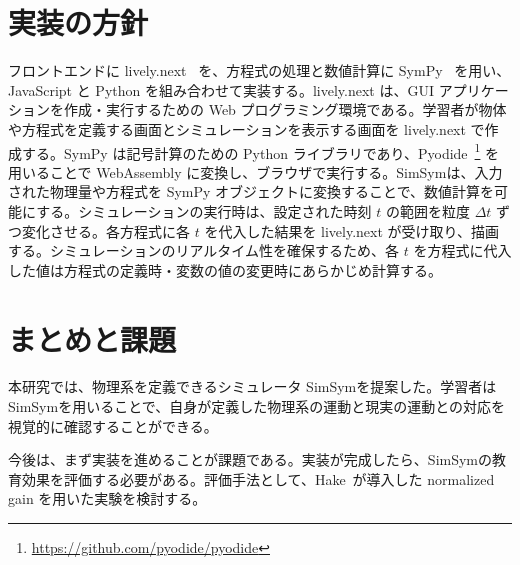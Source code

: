 \documentclass[11pt, a4paper, oneside, twocolumn, dvipdfmx]{jsarticle}
\newcommand{\simname}{SimSym}
\begin{document}
\section{実装の方針} \label{sec3}
フロントエンドに lively.next~\cite{ingalls_2008} を、方程式の処理と数値計算に
SymPy~\cite{meurer_sympy_2017} を用い、JavaScript と Python を組み合わせて実装する。lively.next は、GUI アプリケーションを作成・実行するための Web プログラミング環境である。学習者が物体や方程式を定義する画面とシミュレーションを表示する画面を lively.next で作成する。SymPy は記号計算のための Python ライブラリであり、Pyodide~\footnote{\url{https://github.com/pyodide/pyodide}} を用いることで WebAssembly に変換し、ブラウザで実行する。\simname は、入力された物理量や方程式を SymPy オブジェクトに変換することで、数値計算を可能にする。シミュレーションの実行時は、設定された時刻 $t$ の範囲を粒度 $\Delta t$ ずつ変化させる。各方程式に各 $t$ を代入した結果を lively.next が受け取り、描画する。シミュレーションのリアルタイム性を確保するため、各 $t$ を方程式に代入した値は方程式の定義時・変数の値の変更時にあらかじめ計算する。

\section{まとめと課題}
本研究では、物理系を定義できるシミュレータ \simname を提案した。学習者は\simname を用いることで、自身が定義した物理系の運動と現実の運動との対応を視覚的に確認することができる。

今後は、まず実装を進めることが課題である。実装が完成したら、\simname の教育効果を評価する必要がある。評価手法として、Hake~\cite{hake_1998}が導入した normalized gain を用いた実験を検討する。


\renewcommand{\refname}{}
\vspace{-5mm}
\tiny{}
\end{document}
